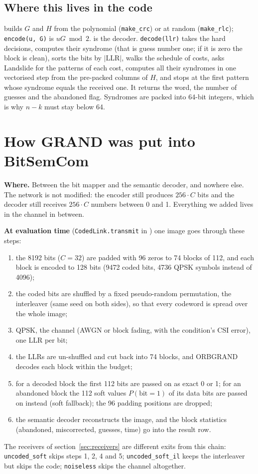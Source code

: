 \documentclass{article}
\begin{document}
\subsection{Where this lives in the code}

 builds $G$ and $H$ from the polynomial (\texttt{make\_crc}) or at random
(\texttt{make\_rlc}); \texttt{encode(u, G)} is $uG \bmod 2$.  is the decoder.
\texttt{decode(llr)} takes the hard decisions, computes their syndrome (that is guess number one; if it is
zero the block is clean), sorts the bits by $|\mathrm{LLR}|$, walks the schedule of costs, asks Landslide
for the patterns of each cost, computes all their syndromes in one vectorised step from the pre-packed
columns of $H$, and stops at the first pattern whose syndrome equals the received one. It returns the
word, the number of guesses and the abandoned flag. Syndromes are packed into 64-bit integers, which is
why $n-k$ must stay below 64.

\section{How GRAND was put into BitSemCom}
\label{sec:integration}

\textbf{Where.} Between the bit mapper and the semantic decoder, and nowhere else. The network is not
modified: the encoder still produces $256\cdot C$ bits and the decoder still receives $256\cdot C$
numbers between 0 and 1. Everything we added lives in the channel in between.

\textbf{At evaluation time} (\texttt{CodedLink.transmit} in ) one
image goes through these steps:
\begin{enumerate}
\item the 8192 bits ($C=32$) are padded with 96 zeros to 74 blocks of 112, and each block is encoded to
128 bits (9472 coded bits, 4736 QPSK symbols instead of 4096);
\item the coded bits are shuffled by a fixed pseudo-random permutation, the interleaver (same seed on
both sides), so that every codeword is spread over the whole image;
\item QPSK, the channel (AWGN or block fading, with the condition's CSI error), one LLR per bit;
\item the LLRs are un-shuffled and cut back into 74 blocks, and ORBGRAND decodes each block within the
budget;
\item for a decoded block the first 112 bits are passed on as exact 0 or 1; for an abandoned block the
112 soft values $P(\text{bit}=1)$ of its data bits are passed on instead (soft fallback); the 96 padding
positions are dropped;
\item the semantic decoder reconstructs the image, and the block statistics (abandoned, miscorrected,
guesses, time) go into the result row.
\end{enumerate}
The receivers of section~\ref{sec:receivers} are different exits from this chain: \texttt{uncoded\_soft}
skips steps 1, 2, 4 and 5; \texttt{uncoded\_soft\_il} keeps the interleaver but skips the code;
\texttt{noiseless} skips the channel altogether.
\end{document}
